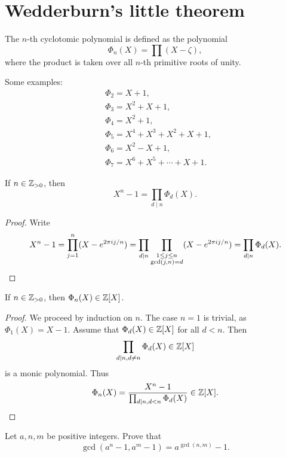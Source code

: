 \section{Wedderburn's little theorem}

\begin{definition}
	The $n$-th cyclotomic polynomial 
	is defined as the polynomial
	\begin{equation}
		\label{eq:ciclotomico}
		\Phi_n(X)=\prod(X-\zeta),
	\end{equation}
	where the product is taken over all 
	$n$-th primitive roots of unity. 
\end{definition}

Some examples:
	\begin{align*}
		&\Phi_2=X+1,\\
		&\Phi_3=X^2+X+1,\\
		&\Phi_4=X^2+1,\\
		&\Phi_5=X^4+X^3+X^2+X+1,\\
		&\Phi_6=X^2-X+1,\\
		&\Phi_7=X^6+X^5+\cdots+X+1.
	\end{align*}

\begin{lemma}
	If $n\in\mathbb{Z}_{>0}$, then
	\[
		X^n-1=\prod_{d\mid n}\Phi_d(X).
	\]
\end{lemma}

\begin{proof}
	Write 
	\[
		X^n-1=\prod_{j=1}^n (X-e^{2\pi ij/n})
		=\prod_{d\mid n}\prod_{\substack{1\leq j\leq n\\\gcd(j,n)=d}}(X-e^{2\pi ij/n})
		=\prod_{d\mid n}\Phi_d(X).\qedhere 
	\]
\end{proof}

\begin{lemma}
	If $n\in\mathbb{Z}_{>0}$, then $\Phi_n(X)\in\mathbb{Z}[X]$.
\end{lemma}

\begin{proof}
	We proceed by induction on $n$. The case $n=1$ is trivial, as 
	$\Phi_1(X)=X-1$. Assume that $\Phi_d(X)\in\mathbb{Z}[X]$ for all $d<n$.
	Then 
	\[
		\prod_{d\mid n,d\ne n}\Phi_d(X)\in\mathbb{Z}[X]
	\]
	is a monic polynomial. Thus 
    \[
    \Phi_n(X)=\frac{X^n-1}{\prod_{d\mid
	n,d<n}\Phi_d(X)}\in\mathbb{Z}[X].\qedhere
    \]
\end{proof}

\begin{exercise}
\label{xca:gcd}
  Let $a,n,m$ be positive integers. Prove that 
  \[
  \gcd(a^n-1,a^m-1)=a^{\gcd(n,m)}-1.
  \]
\end{exercise}

